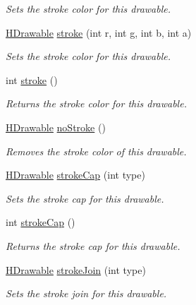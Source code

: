\begin{DoxyCompactItemize}
\begin{DoxyCompactList}\small\item\em Sets the stroke color for this drawable. \end{DoxyCompactList}\item 
\hyperlink{classhype_1_1core_1_1drawable_1_1_h_drawable}{H\-Drawable} \hyperlink{classhype_1_1core_1_1drawable_1_1_h_drawable_a4d8f5cf55e296491fee31d41ee191896}{stroke} (int r, int g, int b, int a)
\begin{DoxyCompactList}\small\item\em Sets the stroke color for this drawable. \end{DoxyCompactList}\item 
int \hyperlink{classhype_1_1core_1_1drawable_1_1_h_drawable_aeef1c190f383562910107be8e5f80461}{stroke} ()
\begin{DoxyCompactList}\small\item\em Returns the stroke color for this drawable. \end{DoxyCompactList}\item 
\hyperlink{classhype_1_1core_1_1drawable_1_1_h_drawable}{H\-Drawable} \hyperlink{classhype_1_1core_1_1drawable_1_1_h_drawable_a356b4f191fa67f5d1a8071bf21cb9f4c}{no\-Stroke} ()
\begin{DoxyCompactList}\small\item\em Removes the stroke color of this drawable. \end{DoxyCompactList}\item 
\hyperlink{classhype_1_1core_1_1drawable_1_1_h_drawable}{H\-Drawable} \hyperlink{classhype_1_1core_1_1drawable_1_1_h_drawable_a6be0948b8687197c07087faac957745c}{stroke\-Cap} (int type)
\begin{DoxyCompactList}\small\item\em Sets the stroke cap for this drawable. \end{DoxyCompactList}\item 
int \hyperlink{classhype_1_1core_1_1drawable_1_1_h_drawable_ab9838a263f6daf6cc85f4fc7f7e038e2}{stroke\-Cap} ()
\begin{DoxyCompactList}\small\item\em Returns the stroke cap for this drawable. \end{DoxyCompactList}\item 
\hyperlink{classhype_1_1core_1_1drawable_1_1_h_drawable}{H\-Drawable} \hyperlink{classhype_1_1core_1_1drawable_1_1_h_drawable_a111ea8108bfe680fcdab67f8dd78e27e}{stroke\-Join} (int type)
\begin{DoxyCompactList}\small\item\em Sets the stroke join for this drawable. \end{DoxyCompactList}\item 

\end{DoxyCompactItemize}
